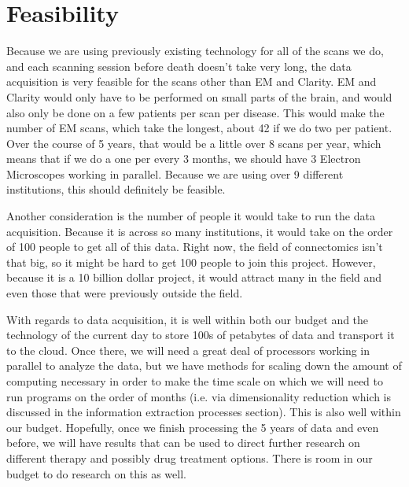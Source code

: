 \documentclass[12pt]{article}
\begin{document}
\section{Feasibility}

Because we are using previously existing technology for all of the scans we do, and each scanning session before death doesn’t take very long, the data acquisition is very feasible for the scans other than EM and Clarity.  EM and Clarity would only have to be performed on small parts of the brain, and would also only be done on a few patients per scan per disease.  This would make the number of EM scans, which take the longest, about 42 if we do two per patient.  Over the course of 5 years, that would be a little over 8 scans per year, which means that if we do a one per every 3 months, we should have 3 Electron Microscopes working in parallel.  Because we are using over 9 different institutions, this should definitely be feasible.

Another consideration is the number of people it would take to run the data acquisition.  Because it is across so many institutions, it would take on the order of 100 people to get all of this data.  Right now, the field of connectomics isn’t that big, so it might be hard to get 100 people to join this project.  However, because it is a 10 billion dollar project, it would attract many in the field and even those that were previously outside the field.

With regards to data acquisition, it is well within both our budget and the technology of the current day to store 100s of petabytes of data and transport it to the cloud.  Once there, we will need a great deal of processors working in parallel to analyze the data, but we have methods for scaling down the amount of computing necessary in order to make the time scale on which we will need to run programs on the order of months (i.e. via dimensionality reduction which is discussed in the information extraction processes section).  This is also well within our budget.  Hopefully, once we finish processing the 5 years of data and even before, we will have results that can be used to direct further research on different therapy and possibly drug treatment options.  There is room in our budget to do research on this as well.



\nocite{*}


 
\end{document}
